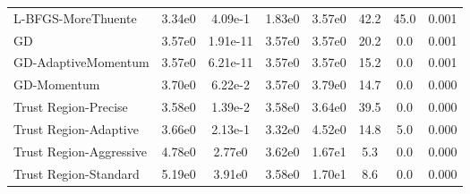 \documentclass{article}
\begin{document}
\begin{table}[htbp]
{\begin{tabular}{p{2.5cm}*{7}{c}}
L-BFGS-MoreThuente & 3.34e0 & 4.09e-1 & 1.83e0 & 3.57e0 & 42.2 & 45.0 & 0.001 \\
GD & 3.57e0 & 1.91e-11 & 3.57e0 & 3.57e0 & 20.2 & 0.0 & 0.001 \\
GD-AdaptiveMomentum & 3.57e0 & 6.21e-11 & 3.57e0 & 3.57e0 & 15.2 & 0.0 & 0.001 \\
GD-Momentum & 3.70e0 & 6.22e-2 & 3.57e0 & 3.79e0 & 14.7 & 0.0 & 0.000 \\
Trust Region-Precise & 3.58e0 & 1.39e-2 & 3.58e0 & 3.64e0 & 39.5 & 0.0 & 0.000 \\
Trust Region-Adaptive & 3.66e0 & 2.13e-1 & 3.32e0 & 4.52e0 & 14.8 & 5.0 & 0.000 \\
Trust Region-Aggressive & 4.78e0 & 2.77e0 & 3.62e0 & 1.67e1 & 5.3 & 0.0 & 0.000 \\
Trust Region-Standard & 5.19e0 & 3.91e0 & 3.58e0 & 1.70e1 & 8.6 & 0.0 & 0.000 \\
\bottomrule
\end{tabular}
}
\end{table}
\end{document}
